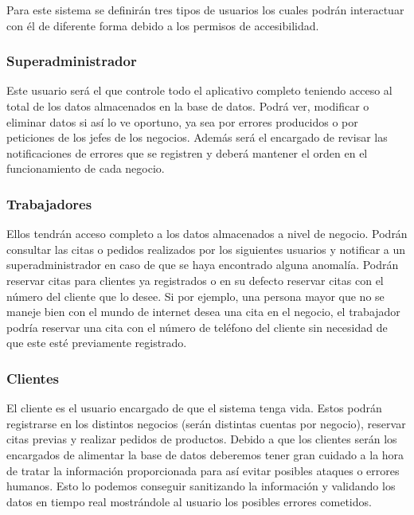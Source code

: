Para este sistema se definirán tres tipos de usuarios los cuales podrán interactuar con él de diferente forma debido a los permisos de accesibilidad.

\subsubsection{Superadministrador}

Este usuario será el que controle todo el aplicativo completo teniendo acceso al total de los datos almacenados en la base de datos. Podrá ver, modificar o eliminar datos si así lo ve oportuno, ya sea por errores producidos o por peticiones de los jefes de los negocios. Además será el encargado de revisar las notificaciones de errores que se registren y deberá mantener el orden en el funcionamiento de cada negocio.

\subsubsection{Trabajadores}

Ellos tendrán acceso completo a los datos almacenados a nivel de negocio. Podrán consultar las citas o pedidos realizados por los siguientes usuarios y notificar a un superadministrador en caso de que se haya encontrado alguna anomalía. Podrán reservar citas para clientes ya registrados o en su defecto reservar citas con el número del cliente que lo desee. Si por ejemplo, una persona mayor que no se maneje bien con el mundo de internet desea una cita en el negocio, el trabajador podría reservar una cita con el número de teléfono del cliente sin necesidad de que este esté previamente registrado.

\subsubsection{Clientes}

El cliente es el usuario encargado de que el sistema tenga vida. Estos podrán registrarse en los distintos negocios (serán distintas cuentas por negocio), reservar citas previas y realizar pedidos de productos. Debido a que los clientes serán los encargados de alimentar la base de datos deberemos tener gran cuidado a la hora de tratar la información proporcionada para así evitar posibles ataques o errores humanos. Esto lo podemos conseguir sanitizando la información y validando los datos en tiempo real mostrándole al usuario los posibles errores cometidos.


